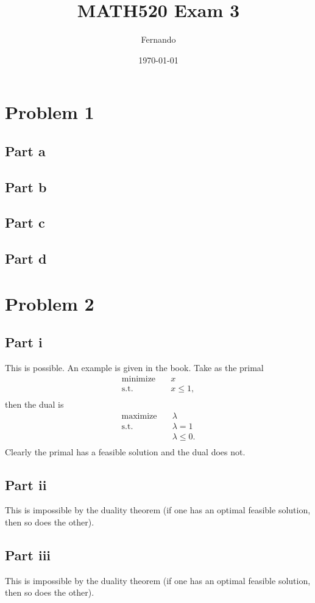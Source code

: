 \documentclass{article}
\begin{document}
\title{MATH520 Exam 3}
\author{Fernando}
\date{\today}
\maketitle

\section*{Problem 1}
\subsection*{Part a}
\subsection*{Part b}
\subsection*{Part c}
\subsection*{Part d}
\section*{Problem 2}
\subsection*{Part i}
This is possible. An example is given in the book. Take as the primal
\[
\begin{aligned}
\text{minimize}\quad & x\\
\textrm{s.t.} \quad &x\leq 1,\\
\end{aligned}
\]
then the dual is
\[
\begin{aligned}
\text{maximize}\quad & \lambda\\
\textrm{s.t.} \quad &\lambda= 1\\
\quad &\lambda\leq 0.\\
\end{aligned}
\]
Clearly the primal has a feasible solution and the dual does not.
\subsection*{Part ii}
This is impossible by the duality theorem (if one has an optimal feasible
solution, then so does the other).
\subsection*{Part iii}
This is impossible by the duality theorem (if one has an optimal feasible
solution, then so does the other).
\end{document}
